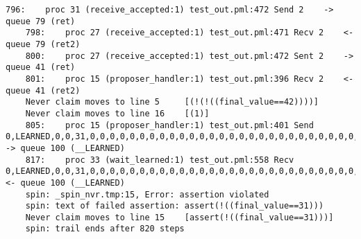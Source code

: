 \begin{lstlisting}[xleftmargin=.01\linewidth, xrightmargin=0.01\linewidth, caption={Message passing caused by the proposer's protocol bug.}, label={lst:paxos_bug}]
    796:    proc 31 (receive_accepted:1) test_out.pml:472 Send 2    -> queue 79 (ret)
    798:    proc 27 (receive_accepted:1) test_out.pml:471 Recv 2    <- queue 79 (ret2)
    800:    proc 27 (receive_accepted:1) test_out.pml:472 Sent 2    -> queue 41 (ret)
    801:    proc 15 (proposer_handler:1) test_out.pml:396 Recv 2    <- queue 41 (ret2)
    Never claim moves to line 5     [(!(!((final_value==42))))]
    Never claim moves to line 16    [(1)]
    805:    proc 15 (proposer_handler:1) test_out.pml:401 Send 0,LEARNED,0,0,31,0,0,0,0,0,0,0,0,0,0,0,0,0,0,0,0,0,0,0,0,0,0,0,0,0,0,0,0,0,0,0,0,0   -> queue 100 (__LEARNED)
    817:    proc 33 (wait_learned:1) test_out.pml:558 Recv 0,LEARNED,0,0,31,0,0,0,0,0,0,0,0,0,0,0,0,0,0,0,0,0,0,0,0,0,0,0,0,0,0,0,0,0,0,0,0,0       <- queue 100 (__LEARNED)
    spin: _spin_nvr.tmp:15, Error: assertion violated
    spin: text of failed assertion: assert(!((final_value==31)))
    Never claim moves to line 15    [assert(!((final_value==31)))]
    spin: trail ends after 820 steps
\end{lstlisting}

